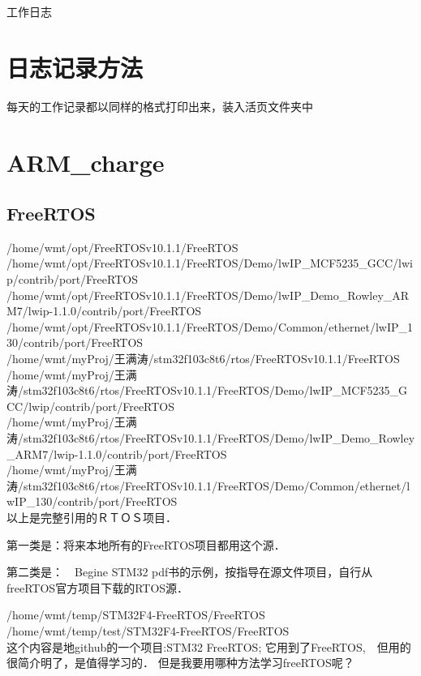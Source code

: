 \documentclass[utf8]{ctexart}
\begin{document}
\begin{bfseries} 
 工作日志
\end{bfseries}

\section {日志记录方法}
每天的工作记录都以同样的格式打印出来，装入活页文件夹中


\section {ARM\_charge}
\subsection {FreeRTOS}
/home/wmt/opt/FreeRTOSv10.1.1/FreeRTOS \\
/home/wmt/opt/FreeRTOSv10.1.1/FreeRTOS/Demo/lwIP_MCF5235_GCC/lwip/contrib/port/FreeRTOS \\
/home/wmt/opt/FreeRTOSv10.1.1/FreeRTOS/Demo/lwIP_Demo_Rowley_ARM7/lwip-1.1.0/contrib/port/FreeRTOS \\
/home/wmt/opt/FreeRTOSv10.1.1/FreeRTOS/Demo/Common/ethernet/lwIP_130/contrib/port/FreeRTOS \\
/home/wmt/myProj/王满涛/stm32f103c8t6/rtos/FreeRTOSv10.1.1/FreeRTOS \\
/home/wmt/myProj/王满涛/stm32f103c8t6/rtos/FreeRTOSv10.1.1/FreeRTOS/Demo/lwIP_MCF5235_GCC/lwip/contrib/port/FreeRTOS \\
/home/wmt/myProj/王满涛/stm32f103c8t6/rtos/FreeRTOSv10.1.1/FreeRTOS/Demo/lwIP_Demo_Rowley_ARM7/lwip-1.1.0/contrib/port/FreeRTOS \\
/home/wmt/myProj/王满涛/stm32f103c8t6/rtos/FreeRTOSv10.1.1/FreeRTOS/Demo/Common/ethernet/lwIP_130/contrib/port/FreeRTOS \\

以上是完整引用的ＲＴＯＳ项目．

第一类是：将来本地所有的FreeRTOS项目都用这个源．

第二类是：　Begine STM32 pdf书的示例，按指导在源文件项目，自行从freeRTOS官方项目下载的RTOS源．


/home/wmt/temp/STM32F4-FreeRTOS/FreeRTOS \\
/home/wmt/temp/test/STM32F4-FreeRTOS/FreeRTOS \\

这个内容是地github的一个项目:STM32 FreeRTOS; 它用到了FreeRTOS,　但用的很简介明了，是值得学习的．
但是我要用哪种方法学习freeRTOS呢？
\end{document}
